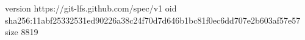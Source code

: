 version https://git-lfs.github.com/spec/v1
oid sha256:11abf25332531ed90226a38c24f70d7d646b1bc81f0ec6dd707e2b603af57e57
size 8819

